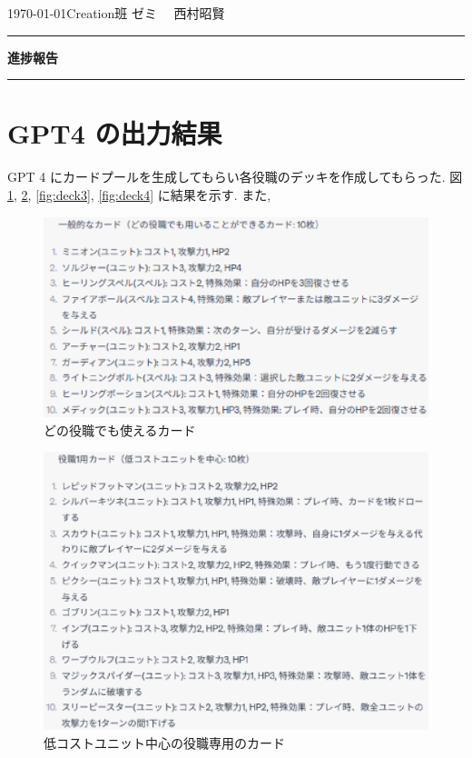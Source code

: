 \documentclass{jarticle}     %
\begin{document}
  \noindent
  \hspace{1em}

  \today Creation班 ゼミ
  \hfill
  \ \  西村昭賢 

  \vspace{2mm}
  \hrule
  \begin{center}
  {\Large \bf 進捗報告}
  \end{center}
  \hrule
  \vspace{3mm}


\section{GPT4 の出力結果}
GPT 4 にカードプールを生成してもらい各役職のデッキを作成してもらった. 図 \ref{fig:deck1}, \ref{fig:deck2}, \ref{fig:deck3}, \ref{fig:deck4} に結果を示す.
また, 

\begin{figure}[ht]
  \centering
  \includegraphics[width=120mm]{assets/1.eps}
  \vspace{-0.3cm}
  \caption{どの役職でも使えるカード}
  \label{fig:deck1}
\end{figure}


\begin{figure}[ht]
  \centering
  \includegraphics[width=120mm]{assets/2.eps}
  \vspace{-0.3cm}
  \caption{低コストユニット中心の役職専用のカード}
  \label{fig:deck2}
\end{figure}
\end{document}
